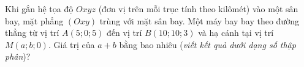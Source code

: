 \begin{ex}%
	Khi gắn hệ tọa độ $Oxyz$ (đơn vị trên mỗi trục tính theo kilômét) vào một sân bay, mặt phẳng $(Oxy)$ trùng với mặt sân bay. Một máy bay bay theo đường thẳng từ vị trí $A(5;0;5)$ đến vị trí $B(10;10;3)$ và hạ cánh tại vị trí $M(a;b;0)$. Giá trị của $a+b$ bằng bao nhiêu (\textit{viết kết quả dưới dạng số thập phân})?
\end{ex}

